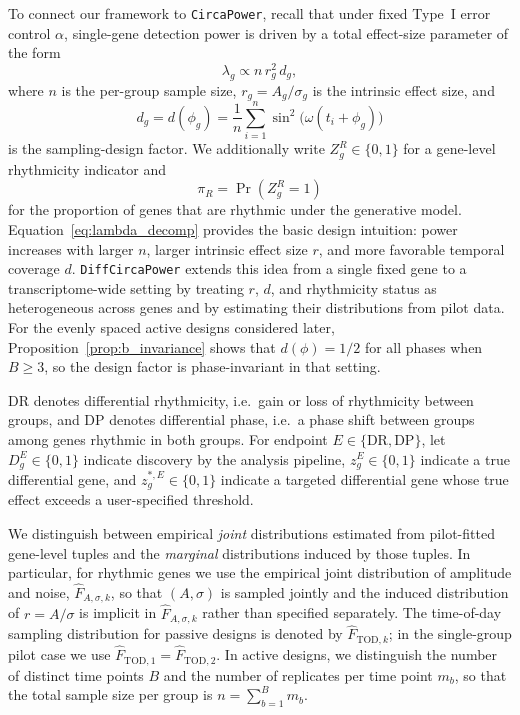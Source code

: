 \documentclass{article}
\newcommand{\software}[1]{\texttt{#1}}
\begin{document}
To connect our framework to \software{CircaPower}, recall that under fixed
Type~I error control $\alpha$, single-gene detection power is driven by a
total effect-size parameter of the form
\begin{equation}
\lambda_g \propto n\,r_g^2\,d_g,
\label{eq:lambda_decomp}
\end{equation}
where $n$ is the per-group sample size, $r_g=A_g/\sigma_g$ is the intrinsic
effect size, and
\begin{equation}
d_g=d(\phi_g)=\frac{1}{n}\sum_{i=1}^n \sin^2\!\bigl(\omega(t_i+\phi_g)\bigr)
\label{eq:design_factor_circapower}
\end{equation}
is the sampling-design factor. We additionally write $Z_g^R\in\{0,1\}$ for a
gene-level rhythmicity indicator and
\begin{equation}
\pi_R=\Pr(Z_g^R=1)
\label{eq:pi_r}
\end{equation}
for the proportion of genes that are rhythmic under the generative model.
Equation~\eqref{eq:lambda_decomp} provides the basic design intuition: power
increases with larger $n$, larger intrinsic effect size $r$, and more
favorable temporal coverage $d$. \software{DiffCircaPower} extends this idea
from a single fixed gene to a transcriptome-wide setting by treating $r$, $d$,
and rhythmicity status as heterogeneous across genes and by estimating their
distributions from pilot data. For the evenly spaced active designs considered
later, Proposition~\ref{prop:b_invariance} shows that $d(\phi)=1/2$ for all
phases when $B\geq 3$, so the design factor is phase-invariant in that setting.

DR denotes differential rhythmicity, i.e.\ gain or loss of rhythmicity between
groups, and DP denotes differential phase, i.e.\ a phase shift between groups
among genes rhythmic in both groups. For endpoint $E\in\{\mathrm{DR},
\mathrm{DP}\}$, let $D_g^E\in\{0,1\}$ indicate discovery by the analysis
pipeline, $z_g^E\in\{0,1\}$ indicate a true differential gene, and
$z_g^{*,E}\in\{0,1\}$ indicate a targeted differential gene whose true effect
exceeds a user-specified threshold.

We distinguish between empirical \emph{joint} distributions estimated from
pilot-fitted gene-level tuples and the \emph{marginal} distributions induced by
those tuples. In particular, for rhythmic genes we use the empirical joint
distribution of amplitude and noise,
$\hat{F}_{A,\sigma,k}$, so that $(A,\sigma)$ is sampled jointly and the
induced distribution of $r=A/\sigma$ is implicit in $\hat{F}_{A,\sigma,k}$
rather than specified separately. The time-of-day sampling distribution for
passive designs is denoted by $\hat{F}_{\mathrm{TOD},k}$; in the single-group
pilot case we use $\hat{F}_{\mathrm{TOD},1}=\hat{F}_{\mathrm{TOD},2}$. In
active designs, we distinguish the number of distinct time points $B$ and the
number of replicates per time point $m_b$, so that the total sample size per
group is $n=\sum_{b=1}^B m_b$.
\end{document}

